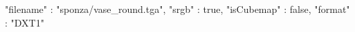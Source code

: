 { 
	"filename" : "sponza/vase_round.tga", 
	"srgb" : true,
	"isCubemap" : false,
	"format" : "DXT1"
}